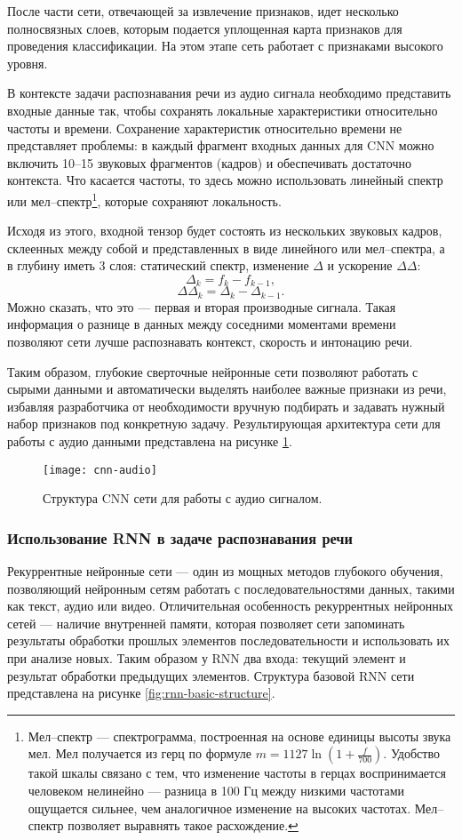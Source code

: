После части сети, отвечающей за извлечение признаков, идет несколько полносвязных слоев, которым подается уплощенная карта признаков для проведения классификации. На этом этапе сеть работает с признаками высокого уровня.

В контексте задачи распознавания речи из аудио сигнала необходимо представить входные данные так, чтобы сохранять локальные характеристики относительно частоты и времени. Сохранение характеристик относительно времени не представляет проблемы: в каждый фрагмент входных данных для CNN можно включить 10--15 звуковых фрагментов (кадров) и обеспечивать достаточно контекста. Что касается частоты, то здесь можно использовать линейный спектр или мел--спектр\footnote{Мел--спектр --- спектрограмма, построенная на основе единицы высоты звука мел. Мел получается из герц по формуле $m = 1127 \ln \left(1 + \frac{f}{700}\right)$. Удобство такой шкалы связано с тем, что изменение частоты в герцах воспринимается человеком нелинейно --- разница в 100 Гц между низкими частотами ощущается сильнее, чем аналогичное изменение на высоких частотах. Мел--спектр позволяет выравнять такое расхождение.}, которые сохраняют локальность.

Исходя из этого, входной тензор будет состоять из нескольких звуковых кадров, склеенных между собой и представленных в виде линейного или мел--спектра, а в глубину иметь 3 слоя: статический спектр, изменение $\Delta$ и ускорение $\Delta\Delta$:
$$\Delta_k = f_k - f_{k - 1},$$
$$\Delta\Delta_k = \Delta_k - \Delta_{k - 1}.$$
Можно сказать, что это --- первая и вторая производные сигнала. Такая информация о разнице в данных между соседними моментами времени позволяют сети лучше распознавать контекст, скорость и интонацию речи.

Таким образом, глубокие сверточные нейронные сети позволяют работать с сырыми данными и автоматически выделять наиболее важные признаки из речи, избавляя разработчика от необходимости вручную подбирать и задавать нужный набор признаков под конкретную задачу. Результирующая архитектура сети для работы с аудио данными представлена на рисунке \ref{fig:cnn-audio}.
\begin{figure}[h]
	\centering
	\texttt{[image: cnn-audio]}
	\caption{Структура CNN сети для работы с аудио сигналом.}
	\label{fig:cnn-audio}
\end{figure}

\subsubsection{Использование RNN в задаче распознавания речи}
\label{section:rnn-in-asr}
Рекуррентные нейронные сети --- один из мощных методов глубокого обучения, позволяющий нейронным сетям работать с последовательностями данных, такими как текст, аудио или видео. Отличительная особенность рекуррентных нейронных сетей --- наличие внутренней памяти, которая позволяет сети запоминать результаты обработки прошлых элементов последовательности и использовать их при анализе новых. Таким образом у RNN два входа: текущий элемент и результат обработки предыдущих элементов. Структура базовой RNN сети представлена на рисунке \ref{fig:rnn-basic-structure}.

